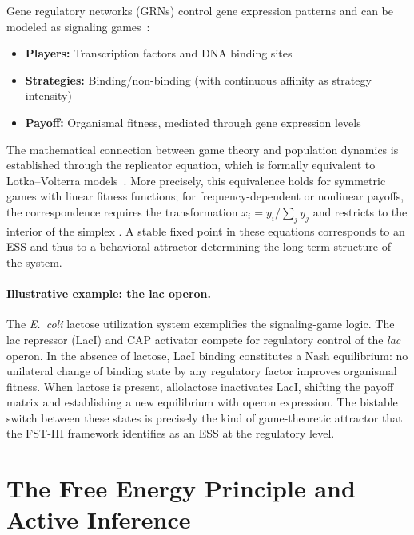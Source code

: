 \documentclass[12pt,a4paper]{article}
\theoremstyle{remark}
\begin{document}
Gene regulatory networks (GRNs) control gene expression patterns and can be modeled as signaling games~\citep{GameBiochemistry}:

\begin{itemize}
    \item \textbf{Players:} Transcription factors and DNA binding sites
    \item \textbf{Strategies:} Binding/non-binding (with continuous affinity as strategy intensity)
    \item \textbf{Payoff:} Organismal fitness, mediated through gene expression levels
\end{itemize}

The mathematical connection between game theory and population dynamics is established through the replicator equation, which is formally equivalent to Lotka--Volterra models~\citep{HofbauerSigmund1998}. More precisely, this equivalence holds for symmetric games with linear fitness functions; for frequency-dependent or nonlinear payoffs, the correspondence requires the transformation $x_i = y_i / \sum_j y_j$ and restricts to the interior of the simplex \citep[Chapter~7]{HofbauerSigmund1998}. A stable fixed point in these equations corresponds to an ESS and thus to a behavioral attractor determining the long-term structure of the system.

\paragraph{Illustrative example: the lac operon.}
The \textit{E.\ coli} lactose utilization system exemplifies the signaling-game logic. The lac repressor (LacI) and CAP activator compete for regulatory control of the \textit{lac} operon. In the absence of lactose, LacI binding constitutes a Nash equilibrium: no unilateral change of binding state by any regulatory factor improves organismal fitness. When lactose is present, allolactose inactivates LacI, shifting the payoff matrix and establishing a new equilibrium with operon expression. The bistable switch between these states is precisely the kind of game-theoretic attractor that the FST-III framework identifies as an ESS at the regulatory level.

\section{The Free Energy Principle and Active Inference}
\label{sec:fep}
\end{document}
